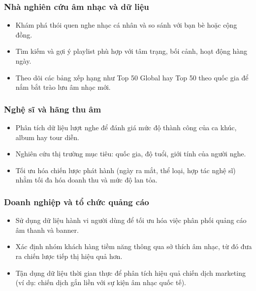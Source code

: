 \documentclass{latex/hcmut-report}
\begin{document}
\subsubsection{Nhà nghiên cứu âm nhạc và dữ liệu}
\begin{itemize}
    \item Khám phá thói quen nghe nhạc cá nhân và so sánh với bạn bè hoặc cộng đồng.

    \item Tìm kiếm và gợi ý playlist phù hợp với tâm trạng, bối cảnh, hoạt động hàng ngày.
    
    \item Theo dõi các bảng xếp hạng như Top 50 Global hay Top 50 theo quốc gia để nắm bắt trào lưu âm nhạc mới.
\end{itemize}

\subsubsection{Nghệ sĩ và hãng thu âm}
\begin{itemize}
    \item Phân tích dữ liệu lượt nghe để đánh giá mức độ thành công của ca khúc, album hay tour diễn.

    \item Nghiên cứu thị trường mục tiêu: quốc gia, độ tuổi, giới tính của người nghe.

    \item Tối ưu hóa chiến lược phát hành (ngày ra mắt, thể loại, hợp tác nghệ sĩ) nhằm tối đa hóa doanh thu và mức độ lan tỏa.
\end{itemize}

\subsubsection{Doanh nghiệp và tổ chức quảng cáo}
\begin{itemize}
    \item Sử dụng dữ liệu hành vi người dùng để tối ưu hóa việc phân phối quảng cáo âm thanh và banner.

    \item Xác định nhóm khách hàng tiềm năng thông qua sở thích âm nhạc, từ đó đưa ra chiến lược tiếp thị hiệu quả hơn.

    \item Tận dụng dữ liệu thời gian thực để phân tích hiệu quả chiến dịch marketing (ví dụ: chiến dịch gắn liền với sự kiện âm nhạc quốc tế).
\end{itemize}
\end{document}
